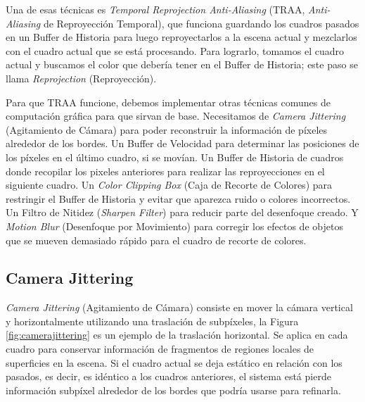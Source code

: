 \documentclass[pregrado]{tesis-usb} %
\begin{document}
Una de esas técnicas es \textit{Temporal Reprojection Anti-Aliasing}  (TRAA, \textit{Anti-Aliasing} de Reproyección Temporal), que funciona guardando los cuadros pasados en un Buffer de Historia para luego reproyectarlos a la escena actual y mezclarlos con el cuadro actual que se está procesando. Para lograrlo, tomamos el cuadro actual y buscamos el color que debería tener en el Buffer de Historia; este paso se llama \textit{Reprojection} (Reproyección).

Para que TRAA funcione, debemos implementar otras técnicas comunes de computación gráfica para que sirvan de base. Necesitamos de \textit{Camera Jittering} (Agitamiento de Cámara) para poder reconstruir la información de píxeles alrededor de los bordes. Un Buffer de Velocidad para determinar las posiciones de los píxeles en el último cuadro, si se movían. Un Buffer de Historia de cuadros donde recopilar los pixeles anteriores para realizar las reproyecciones en el siguiente cuadro. Un \textit{Color Clipping Box} (Caja de Recorte de Colores) para restringir el Buffer de Historia y evitar que aparezca ruido o colores incorrectos. Un Filtro de Nitidez (\textit{Sharpen Filter}) para reducir parte del desenfoque creado. Y \textit{Motion Blur} (Desenfoque por Movimiento) para corregir los efectos de objetos que se mueven demasiado rápido para el cuadro de recorte de colores.


\subsection{Camera Jittering}
\textit{Camera Jittering} (Agitamiento de Cámara) consiste en mover la cámara vertical y horizontalmente utilizando una traslación de subpíxeles, la Figura \ref{fig:camerajittering} es un ejemplo de la traslación horizontal. Se aplica en cada cuadro para conservar información de fragmentos de regiones locales de superficies en la escena. Si el cuadro actual se deja estático en relación con los pasados, es decir, es idéntico a los cuadros anteriores, el sistema está pierde información subpíxel alrededor de los bordes que podría usarse para refinarla.  ~\cite{Fuglsand2016, XU2016}
\end{document}
